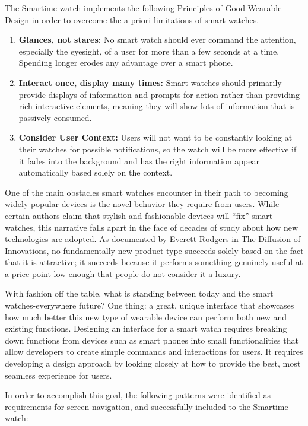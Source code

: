 \documentclass{article}
\begin{document}
The Smartime watch implements the following Principles of Good Wearable Design in order to overcome the a priori limitations of smart watches.

\begin{enumerate}
\item \textbf{Glances, not stares:} No smart watch should ever command the attention, especially the eyesight, of a user for more than a few seconds at a time. Spending longer erodes any advantage over a smart phone.
\item \textbf{Interact once, display many times:} Smart watches should primarily provide displays of information and prompts for action rather than providing rich interactive elements, meaning they will show lots of information that is passively consumed.
\item  \textbf{Consider User Context:}  Users will not want to be constantly looking at their watches for possible notifications, so the watch will be more effective if it fades into the background and has the right information appear automatically based solely on the context. 
\end{enumerate}

One of the main obstacles smart watches encounter in their path to becoming widely popular devices is the novel behavior they require from users. While certain authors claim that stylish and fashionable devices will ``fix'' smart watches\cite{darmour2012}, this narrative falls apart in the face of decades of study about how new technologies are adopted. As documented by Everett Rodgers in The Diffusion of Innovations, no fundamentally new product type succeeds solely based on the fact that it is attractive; it succeeds because it performs something genuinely useful at a price point low enough that people do not consider it a luxury. 

With fashion off the table, what is standing between today and the smart watches-everywhere future? One thing: a great, unique interface that showcases how much better this new type of wearable device can perform both new and existing functions. Designing an interface for a smart watch requires breaking down functions from devices such as smart phones into small functionalities that allow developers to create simple commands and interactions for users. It requires developing a design approach by looking closely at how to provide the best, most seamless experience for users.

In order to accomplish this goal, the following patterns were identified as requirements for screen navigation, and successfully included to the Smartime watch:
\end{document}

